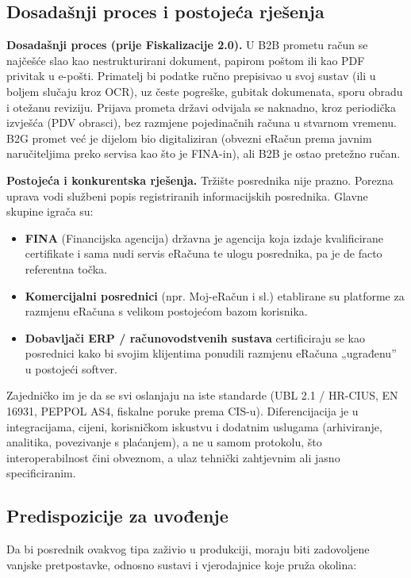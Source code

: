 \documentclass[11pt,a4paper]{article}
\begin{document}
\subsection{Dosadašnji proces i postojeća rješenja}

\textbf{Dosadašnji proces (prije Fiskalizacije 2.0).} U B2B prometu račun se najčešće slao kao
nestrukturirani dokument, papirom poštom ili kao PDF privitak u e-pošti. Primatelj
bi podatke ručno prepisivao u svoj sustav (ili u boljem slučaju kroz OCR), uz česte
pogreške, gubitak dokumenata, sporu obradu i otežanu reviziju. Prijava prometa državi
odvijala se naknadno, kroz periodička izvješća (PDV obrasci), bez razmjene pojedinačnih
računa u stvarnom vremenu. B2G promet već je dijelom bio digitaliziran (obvezni eRačun prema
javnim naručiteljima preko servisa kao što je FINA-in), ali B2B je ostao pretežno ručan.

\textbf{Postojeća i konkurentska rješenja.} Tržište posrednika nije prazno. Porezna uprava
vodi službeni popis registriranih informacijskih posrednika. Glavne skupine igrača su:

\begin{itemize}[nosep]
  \item \textbf{FINA} (Financijska agencija) državna je agencija koja izdaje kvalificirane
        certifikate i sama nudi servis eRačuna te ulogu posrednika, pa je de facto referentna točka.
  \item \textbf{Komercijalni posrednici} (npr. Moj-eRačun i sl.) etablirane su platforme
        za razmjenu eRačuna s velikom postojećom bazom korisnika.
  \item \textbf{Dobavljači ERP / računovodstvenih sustava} certificiraju se kao posrednici
        kako bi svojim klijentima ponudili razmjenu eRačuna „ugrađenu” u postojeći softver.
\end{itemize}

Zajedničko im je da se svi oslanjaju na iste standarde (UBL 2.1 / HR-CIUS, EN 16931,
PEPPOL AS4, fiskalne poruke prema CIS-u). Diferencijacija je u integracijama, cijeni,
korisničkom iskustvu i dodatnim uslugama (arhiviranje, analitika, povezivanje s plaćanjem), a
ne u samom protokolu, što interoperabilnost čini obveznom, a ulaz tehnički zahtjevnim ali
jasno specificiranim.

\subsection{Predispozicije za uvođenje}

Da bi posrednik ovakvog tipa zaživio u produkciji, moraju biti zadovoljene vanjske
pretpostavke, odnosno sustavi i vjerodajnice koje pruža okolina:
\end{document}
